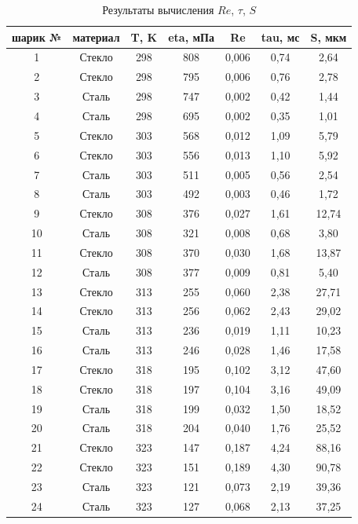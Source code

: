 \documentclass[a4paper, 12pt]{article}
\begin{document}
    \begin{table}[!ht]
        \centering
        \begin{tabular}{|c|c|c|c|c|c|c|}
            \hline
            шарик № & материал & T, K & eta, мПа & Re & tau, мс & S, мкм \\ \hline
            1 & Стекло & 298 & 808 & 0,006 & 0,74 & 2,64  \\ \hline
            2 & Стекло & 298 & 795 & 0,006 & 0,76 & 2,78  \\ \hline
            3 & Сталь & 298 & 747 & 0,002 & 0,42 & 1,44  \\ \hline
            4 & Сталь & 298 & 695 & 0,002 & 0,35 & 1,01  \\ \hline
            5 & Стекло & 303 & 568 & 0,012 & 1,09 & 5,79  \\ \hline
            6 & Стекло & 303 & 556 & 0,013 & 1,10 & 5,92  \\ \hline
            7 & Сталь & 303 & 511 & 0,005 & 0,56 & 2,54  \\ \hline
            8 & Сталь & 303 & 492 & 0,003 & 0,46 & 1,72  \\ \hline
            9 & Стекло & 308 & 376 & 0,027 & 1,61 & 12,74  \\ \hline
            10 & Сталь & 308 & 321 & 0,008 & 0,68 & 3,80  \\ \hline
            11 & Стекло & 308 & 370 & 0,030 & 1,68 & 13,87  \\ \hline
            12 & Сталь & 308 & 377 & 0,009 & 0,81 & 5,40  \\ \hline
            13 & Стекло & 313 & 255 & 0,060 & 2,38 & 27,71  \\ \hline
            14 & Стекло & 313 & 256 & 0,062 & 2,43 & 29,02  \\ \hline
            15 & Сталь & 313 & 236 & 0,019 & 1,11 & 10,23  \\ \hline
            16 & Сталь & 313 & 246 & 0,028 & 1,46 & 17,58  \\ \hline
            17 & Стекло & 318 & 195 & 0,102 & 3,12 & 47,60  \\ \hline
            18 & Стекло & 318 & 197 & 0,104 & 3,16 & 49,09  \\ \hline
            19 & Сталь & 318 & 199 & 0,032 & 1,50 & 18,52  \\ \hline
            20 & Сталь & 318 & 204 & 0,040 & 1,76 & 25,52  \\ \hline
            21 & Стекло & 323 & 147 & 0,187 & 4,24 & 88,16  \\ \hline
            22 & Стекло & 323 & 151 & 0,189 & 4,30 & 90,78  \\ \hline
            23 & Сталь & 323 & 121 & 0,073 & 2,19 & 39,36  \\ \hline
            24 & Сталь & 323 & 127 & 0,068 & 2,13 & 37,25  \\ \hline
        \end{tabular}
        \caption{Результаты вычисления $Re$, $\tau$, $S$}
        \label{re_tau_s}
    \end{table}
\end{document}
